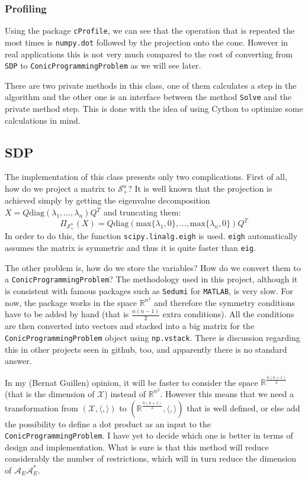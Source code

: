 \documentclass[paper=a4, fontsize=11pt]{scrartcl}
\numberwithin{equation}{section}		%
\numberwithin{figure}{section}			%
\numberwithin{table}{section}				%
\begin{document}
\subsubsection{Profiling}
Using the package \texttt{cProfile}, we can see that the operation that is repeated the most times is \texttt{numpy.dot} followed by the projection onto the cone. However in real applications this is not very much compared to the cost of converting from \texttt{SDP} to \texttt{ConicProgrammingProblem} as we will see later.

There are two private methods in this class, one of them calculates a step in the algorithm and the other one is an interface between the method \texttt{Solve} and the private method step. This is done with the idea of using Cython to optimize some calculations in mind.
\subsection{SDP\label{sec:SDP}}
The implementation of this class presents only two complications. First of all, how do we project a matrix to $\mathcal{S}^n_+$? It is well known that the projection is achieved simply by getting the eigenvalue decomposition $X = Q\text{diag}(\lambda_1,\dots,\lambda_n)Q^T$ and truncating them:
\begin{equation}
\Pi_{\mathcal{S}^n_+}(X) = Q\text{diag}(\text{max}\{\lambda_1,0\},\dots,\text{max}\{\lambda_n,0\})Q^T
\end{equation}
In order to do this, the function \texttt{scipy.linalg.eigh} is used. \texttt{eigh} automatically assumes the matrix is symmetric and thus it is quite faster than \texttt{eig}.

The other problem is, how do we store the variables? How do we convert them to a \texttt{ConicProgrammingProblem}? The methodology used in this project, although it is consistent with famous packages such as \texttt{Sedumi} for \texttt{MATLAB}, is very slow. For now, the package works in the space $\mathbb{R}^{n^2}$ and therefore the symmetry conditions have to be added by hand (that is $\frac{n(n-1)}{2}$ extra conditions). All the conditions are then converted into vectors and stacked into a big matrix for the \texttt{ConicProgrammingProblem} object using \texttt{np.vstack}. There is discussion regarding this in other projects \cite{gitsym} seen in github, too, and apparently there is no standard answer. 

In my (Bernat Guillen) opinion, it will be faster to consider the space $\mathbb{R}^{\frac{n(n+1)}{2}}$ (that is the dimension of $\mathcal{X}$) instead of $\mathbb{R}^{n^2}$. However this means that we need a transformation from $(\mathcal{X},\langle,\rangle)$ to $(\mathbb{R}^{\frac{n(n+1)}{2}},\langle,\rangle)$ that is well defined, or else add the possibility to define a dot product as an input to the  \texttt{ConicProgrammingProblem}. I have yet to decide which one is better in terms of design and implementation. What is sure is that this method will reduce considerably the number of restrictions, which will in turn reduce the dimension of $\mathcal{A}_E\mathcal{A}_E^*$.
\end{document}
